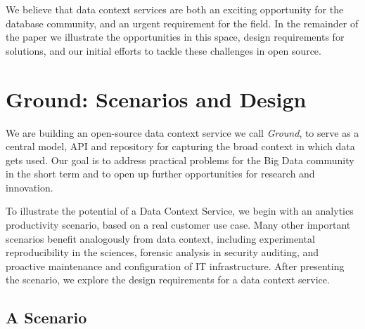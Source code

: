 \documentclass{sig-alternate}
\begin{document}
We believe that data context services are both an exciting opportunity for the database community, and an urgent requirement for the field.
In the remainder of the paper we illustrate the opportunities in this space, design requirements for solutions, and our initial efforts to tackle these challenges in open source.


\section{Ground: Scenarios and Design}
We are building an open-source data context service we call \emph{Ground}, to serve as a central model, API and repository for capturing the broad context in which data gets used. Our goal is to address practical problems for the Big Data community in the short term and to open up further opportunities for research and innovation.


To illustrate the potential of a Data Context Service, we begin with an analytics productivity scenario, based on a real customer use case.   Many other important scenarios benefit analogously from data context, including experimental reproducibility in the sciences, forensic analysis in security auditing, and proactive maintenance and configuration of IT infrastructure. After presenting the scenario, we explore the design requirements for a data context service.

\subsection{A Scenario}
\label{sec:scenarios}
\end{document}

